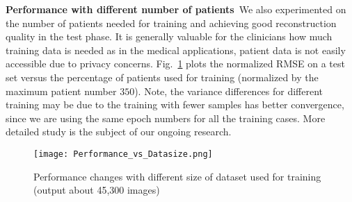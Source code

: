 \documentclass{journal}
\begin{document}
\noindent\textbf{Performance with different number of patients}~We also experimented on the number of patients needed for training and achieving good reconstruction quality in the test phase. It is generally valuable for the clinicians how much training data is needed as in the medical applications, patient data is not easily accessible due to privacy concerns. Fig.~\ref{fig:fig_performance} plots the normalized RMSE on a test set versus the percentage of patients used for training (normalized by the maximum patient number $350$). Note, the variance differences for different training may be due to the training with fewer samples has better convergence, since we are using the same epoch numbers for all the training cases. More detailed study is the subject of our ongoing research. 



\begin{figure}[t]
	\centering
	\hspace{0.0cm}\texttt{[image: Performance\_vs\_Datasize.png]}
	\caption{Performance changes with different size of dataset used for training (output about 45,300 images) }
	\label{fig:fig_performance}
\end{figure}





%
%
\end{document}

